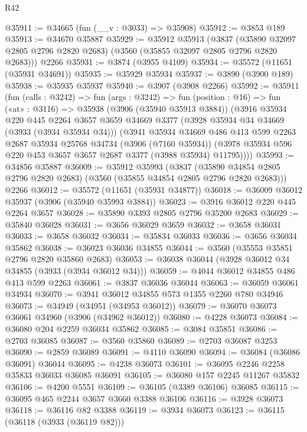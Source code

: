 \begin{lexlean}{R42}
\begin{coremodule}
@35911 := @34665 (fun (__v : @3033) => @35908)
@35912 := @3853 @189
@35913 := @34670 @35887
@35929 := @35912
    @35913
    (@3837 (@35890 @32097 @2805 @2796 @2820 @2683) (@3560 (@35855 @32097 @2805 @2796 @2820 @2683)))
    @2266
@35931 := @3874 (@3955 @4109)
@35934 := @35572 (@11651 (@35931 @34691))
@35935 := @35929 @35934
@35937 := @3890 (@3900 @189)
@35938 := @35935 @35937
@35940 := @3907 (@3908 @2266)
@35992 := @35911
    (fun (calls : @3242) =>
    fun (args : @3242) =>
    fun (position : @16) =>
    fun («at» : @3116) =>
    @35938
      (@3906 (@35940 @35913 @3884))
      (@3916
        @35934
        @220
        @445
        @2264
        @3657
        @3659
        @34669
        @3377
        (@3928 @35934 @34 @34669 (@3933 (@3934 @35934 @34)))
        (@3941
          @35934
          @34669
          @486
          @413
          @599
          @2263
          @2687
          @35934
          @25768
          @34734
          (@3906 (@7160 @35934))
          (@3978 @35934 @596 @220 @453 @3657 @3657 @2687 @3377 (@3988 @35934) @11795))))
@35993 := @34856 @35887
@36009 := @35912
    @35993
    (@3837 (@35890 @34854 @2805 @2796 @2820 @2683) (@3560 (@35855 @34854 @2805 @2796 @2820 @2683)))
    @2266
@36012 := @35572 (@11651 (@35931 @34877))
@36018 := @36009 @36012 @35937 (@3906 (@35940 @35993 @3884))
@36023 := @3916 @36012 @220 @445 @2264 @3657
@36028 := @35890 @3393 @2805 @2796 @35200 @2683
@36029 := @35840 @36028
@36031 := @3656 @36029 @3659
@36032 := @3658 @36031
@36033 := @3658 @36032
@36034 := @35834 @36033
@36036 := @3656 @36034 @35862
@36038 := @36023 @36036 @34855
@36044 := @3560 (@35553 @35851 @2796 @2820 @35860 @2683)
@36053 := @36038 @36044 (@3928 @36012 @34 @34855 (@3933 (@3934 @36012 @34)))
@36059 := @4044 @36012 @34855 @486 @413 @599 @2263
@36061 := @3837 @36036 @36044
@36063 := @36059 @36061 @34934
@36070 := @3941 @36012 @34855 @573 @1355 @2260 @780 @34946
@36073 := @34949 (@34951 (@34953 @36012))
@36079 := @36070 @36073 @36061 @34960 (@3906 (@34962 @36012))
@36080 := @4228 @36073
@36084 := @36080 @204 @2259 @36034 @35862
@36085 := @3084 @35851
@36086 := @2703 @36085
@36087 := @3560 @35860
@36089 := @2703 @36087 @3253
@36090 := @2859 @36089
@36091 := @4110 @36090
@36094 := @36084 (@36086 @36091) @36044
@36095 := @4238 @36073
@36101 := @36095 @2246 @2258 @35833 @36033 @36085 @36091
@36105 := @36080 @157 @2245 @11267 @35832
@36106 := @4200 @5551
@36109 := @36105 (@3389 @36106) @36085
@36115 := @36095 @465 @2244 @3657 @3660 @3388 @36106
@36116 := @3928 @36073
@36118 := @36116 @82 @3388
@36119 := @3934 @36073
@36123 := @36115 (@36118 (@3933 (@36119 @82)))

\end{coremodule}
\end{lexlean}
